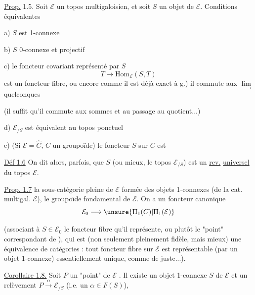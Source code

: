\uline{Prop.} 1.5. Soit \(\mathcal E\) un topos multigaloisien,
et soit \(S\) un objet de \(\mathcal E\). Conditions équivalentes

a) \(S\) est 1-connexe

b) \(S\)  0-connexe et projectif

c) le foncteur covariant représenté par \(S\)
\[
T\longmapsto\mathrm{Hom}_{\mathcal E}(S,T)
\]
est un foncteur fibre, ou encore
comme il est déjà exact à g.) il commute aux
\(\underset{\longrightarrow}{\lim}\) quelconques

 (il suffit qu'il commute aux sommes et au passage
au quotient...)

d) \(\mathcal E_{/S}\) est équivalent au topos ponctuel

e) (Si \(\mathcal E=\widehat C\), \(C\) un groupoïde) le foncteur
\(S\) sur \(C\) est 

\uline{Déf 1.6} On dit alors, parfois, que \(S\) (ou mieux, le topos
\(\mathcal E_{/S}\)) est un \uline{rev.} \uline{universel} du topos
 \(\mathcal E\).

\uline{Prop. 1.7}
 la sous-catégorie pleine de
\(\mathcal E\) formée des objets 1-connexes
(de la cat. multigal. \(\mathcal E\)),
 
le groupoïde fondamental 
 de \(\mathcal E\).
On a un foncteur canonique
\[
\mathcal E_0\longrightarrow
\unsure{\Pi_1(C)|\Pi_1(\mathcal E)}
\]

(associant à  \(S\in\mathcal E_0\)
le foncteur fibre qu'il représente, ou plutôt le "point" correspondant
de ), qui est
(non seulement pleinement fidèle, mais mieux) une équivalence de
catégories : tout foncteur fibre sur \(\mathcal E\) est représentable
(par un objet 1-connexe) essentiellement unique, comme de juste...).


\uline{Corollaire 1.8.} Soit \(P\) un "point" de \(\mathcal E\)
.
Il existe un objet 1-connexe \(S\) de \(\mathcal E\) et un relèvement
\(P\xrightarrow{\alpha}\mathcal E_{/S}\)
(i.e. un \(\alpha\in F(S)\)),


